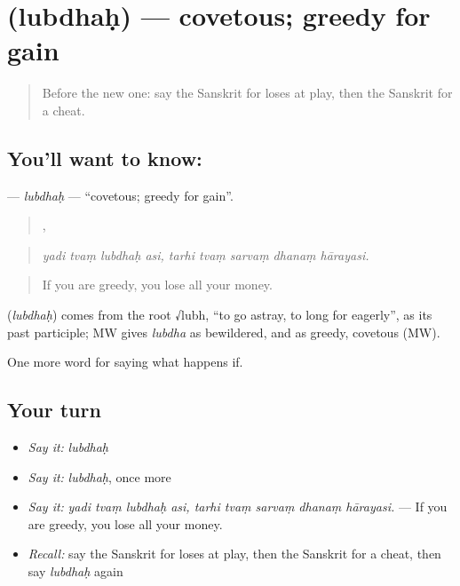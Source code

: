 \section[\texorpdfstring{\sk{लुब्धः} (lubdhaḥ)}{लुब्धः (lubdhaḥ)}]{ (lubdhaḥ) — covetous; greedy for gain}

\label{lesson:SA-C537-lubdhah}



\begin{quote}
Before the new one: say the Sanskrit for loses at play, then the Sanskrit for a cheat.
\end{quote}

\subsection*{You'll want to know: }
\textbf{} — \emph{lubdhaḥ} — \textquotedblleft{}covetous; greedy for gain\textquotedblright{}.

\begin{quote}
   ,     
\end{quote}

\begin{quote}
\emph{yadi tvaṃ lubdhaḥ asi, tarhi tvaṃ sarvaṃ dhanaṃ hārayasi.}
\end{quote}

\begin{quote}
If you are greedy, you lose all your money.
\end{quote}

\begin{cousinweb}
\textbf{} (\emph{lubdhaḥ}) comes from the root √lubh, \textquotedblleft{}to go astray, to long for eagerly\textquotedblright{}, as its past participle; MW gives \emph{lubdha} as bewildered, and as greedy, covetous (MW).
\end{cousinweb}

\begin{grammarlens}[title={What you've built}]
One more word for saying what happens if.
\end{grammarlens}

\subsection*{Your turn}
\begin{itemize}
\raggedright
  \item \emph{Say it:} \emph{lubdhaḥ}
  \item \emph{Say it:} \emph{lubdhaḥ}, once more
  \item \emph{Say it:} \emph{yadi tvaṃ lubdhaḥ asi, tarhi tvaṃ sarvaṃ dhanaṃ hārayasi.} — If you are greedy, you lose all your money.
  \item \emph{Recall:} say the Sanskrit for loses at play, then the Sanskrit for a cheat, then say \emph{lubdhaḥ} again
\end{itemize}

